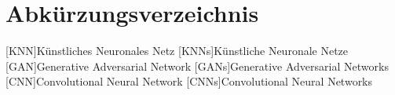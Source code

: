 \chapter*{Abkürzungsverzeichnis} 
\begin{acronym}
[KNN]{Künstliches Neuronales Netz}
[KNNs]{Künstliche Neuronale Netze}
[GAN]{Generative Adversarial Network}
[GANs]{Generative Adversarial Networks}
[CNN]{Convolutional Neural Network}
[CNNs]{Convolutional Neural Networks}
\end{acronym}
